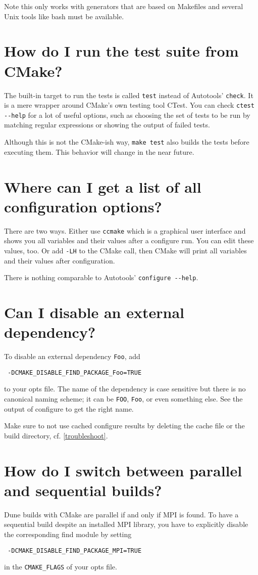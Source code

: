 \documentclass[a4paper,10pt,DIV9,headings=small]{scrartcl}
\begin{document}
Note this only works with generators that are based on Makefiles and several Unix tools like bash must be
available.

\section{How do I run the test suite from CMake?}
\label{tests}
The built-in target to run the tests is called \lstinline!test! instead of Autotools' \lstinline!check!.
It is a mere wrapper around CMake's own testing tool CTest. You can check \lstinline!ctest --help!
for a lot of useful options, such as choosing the set of tests to be run by matching regular expressions or
showing the output of failed tests.

Although this is not the CMake-ish way, \lstinline!make test! also builds the tests before executing them.
This behavior will change in the near future.

\section{Where can I get a list of all configuration options?}
\label{listconfigurations}
There are two ways. Either use \lstinline!ccmake! which is a graphical user interface and shows
you all variables and their values after a configure run. You can edit these values, too. Or
add \lstinline!-LH! to the CMake call, then CMake will print all variables and their values
after configuration.

There is nothing comparable to Autotools' \lstinline!configure --help!.

\section{Can I disable an external dependency?}
\label{disabledependency}
To disable an external dependency \lstinline!Foo!, add
\begin{lstlisting}
 -DCMAKE_DISABLE_FIND_PACKAGE_Foo=TRUE
\end{lstlisting}
to your opts file. The name of the dependency is case sensitive but there is no canonical naming
scheme; it can be \lstinline!FOO!, \lstinline!Foo!, or even something else. See the output of configure
to get the right name.

Make sure to not use cached configure results by deleting the cache file or the build directory, cf.
\ref{troubleshoot}.

\section{How do I switch between parallel and sequential builds?}
\label{parallel}
Dune builds with CMake are parallel if and only if MPI is found. To have a sequential build despite an installed MPI library, you have to explicitly disable the corresponding find module by setting
\begin{lstlisting}
 -DCMAKE_DISABLE_FIND_PACKAGE_MPI=TRUE
\end{lstlisting}
in the \lstinline!CMAKE_FLAGS! of your opts file.
\end{document}
